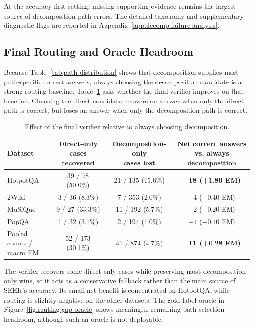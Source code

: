 At the accuracy-first setting, missing supporting evidence remains the largest source of decomposition-path errors. The detailed taxonomy and supplementary diagnostic flags are reported in Appendix~\ref{app:decomp-failure-analysis}.

\subsection{Final Routing and Oracle Headroom}
\label{sec:oracle-analysis}

Because Table~\ref{tab:path-distribution} shows that decomposition supplies most path-specific correct answers, always choosing the decomposition candidate is a strong routing baseline. Table~\ref{tab:oracle} asks whether the final verifier improves on that baseline. Choosing the direct candidate recovers an answer when only the direct path is correct, but loses an answer when only the decomposition path is correct.

\begin{table}[H]
    \centering
    \caption[Effect of Final Routing]{Effect of the final verifier relative to always choosing decomposition.}
    \label{tab:oracle}
    \setlength{\tabcolsep}{8pt}
    \small
    \begin{tabular}{ l c c c }
        \toprule
        Dataset & \shortstack{Direct-only cases\\recovered} & \shortstack{Decomposition-only\\cases lost} & \shortstack{Net correct answers\\vs. always decomposition} \\
        \midrule
        HotpotQA & 39 / 78 (50.0\%) & 21 / 135 (15.6\%) & \textbf{+18 (+1.80 EM)} \\
        2Wiki & 3 / 36 (8.3\%) & 7 / 353 (2.0\%) & $-4$ ($-0.40$ EM) \\
        MuSiQue & 9 / 27 (33.3\%) & 11 / 192 (5.7\%) & $-2$ ($-0.20$ EM) \\
        PopQA & 1 / 32 (3.1\%) & 2 / 194 (1.0\%) & $-1$ ($-0.10$ EM) \\
        \midrule
        \shortstack[l]{Pooled counts /\\macro EM} & 52 / 173 (30.1\%) & 41 / 874 (4.7\%) & \textbf{+11 (+0.28 EM)} \\
        \bottomrule
    \end{tabular}
\end{table}

The verifier recovers some direct-only cases while preserving most decomposition-only wins, so it acts as a conservative fallback rather than the main source of SEEK's accuracy. Its small net benefit is concentrated on HotpotQA, while routing is slightly negative on the other datasets. The gold-label oracle in Figure~\ref{fig:routing-gap-oracle} shows meaningful remaining path-selection headroom, although such an oracle is not deployable.

